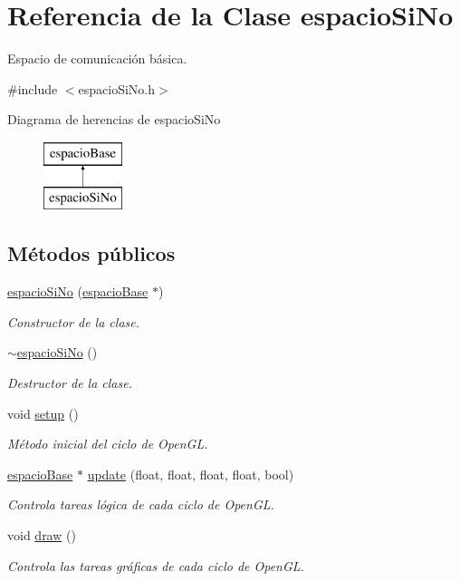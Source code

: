 \hypertarget{classespacio_si_no}{}\section{Referencia de la Clase espacio\+Si\+No}
\label{classespacio_si_no}


Espacio de comunicación básica.  




{\ttfamily \#include $<$espacio\+Si\+No.\+h$>$}

Diagrama de herencias de espacio\+Si\+No\begin{figure}[H]
\begin{center}
\leavevmode
\includegraphics[height=2.000000cm]{classespacio_si_no}
\end{center}
\end{figure}
\subsection*{Métodos públicos}
\begin{DoxyCompactItemize}
\item 
\hyperlink{classespacio_si_no_ae97b5c52c884882f1adfefcc0a42d6ee}{espacio\+Si\+No} (\hyperlink{classespacio_base}{espacio\+Base} $\ast$)
\begin{DoxyCompactList}\small\item\em Constructor de la clase. \end{DoxyCompactList}\item 
\hyperlink{classespacio_si_no_a57a9a2c175f12aa908e05bb32437062e}{$\sim$espacio\+Si\+No} ()
\begin{DoxyCompactList}\small\item\em Destructor de la clase. \end{DoxyCompactList}\item 
void \hyperlink{classespacio_si_no_a4094daf8c4bcc9ca7a0303fb4c41859f}{setup} ()
\begin{DoxyCompactList}\small\item\em Método inicial del ciclo de Open\+G\+L. \end{DoxyCompactList}\item 
\hyperlink{classespacio_base}{espacio\+Base} $\ast$ \hyperlink{classespacio_si_no_a4adfb774583e44929d17422d510b3e87}{update} (float, float, float, float, bool)
\begin{DoxyCompactList}\small\item\em Controla tareas lógica de cada ciclo de Open\+G\+L. \end{DoxyCompactList}\item 
void \hyperlink{classespacio_si_no_a9e413357608b8009da2f048b68220cbc}{draw} ()
\begin{DoxyCompactList}\small\item\em Controla las tareas gráficas de cada ciclo de Open\+G\+L. \end{DoxyCompactList}\end{DoxyCompactItemize}
